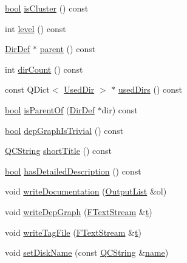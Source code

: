 \begin{DoxyCompactItemize}
\item 
\hyperlink{qglobal_8h_a1062901a7428fdd9c7f180f5e01ea056}{bool} \hyperlink{class_dir_def_a2deda1c14a47090a00a91271860ce7bf}{is\+Cluster} () const 
\item 
int \hyperlink{class_dir_def_aaf4bef6c8d1dcf6219121372c72b7812}{level} () const 
\item 
\hyperlink{class_dir_def}{Dir\+Def} $\ast$ \hyperlink{class_dir_def_a841f399b390e1d0ff927629db1186b9f}{parent} () const 
\item 
int \hyperlink{class_dir_def_ac6081a8ef74c5c231d90c268fd10c474}{dir\+Count} () const 
\item 
const Q\+Dict$<$ \hyperlink{class_used_dir}{Used\+Dir} $>$ $\ast$ \hyperlink{class_dir_def_a7df88c7c7bc1bec99cd726c233fdd997}{used\+Dirs} () const 
\item 
\hyperlink{qglobal_8h_a1062901a7428fdd9c7f180f5e01ea056}{bool} \hyperlink{class_dir_def_a4f9f8fa0a9d2415b6d934fd9ed9bcd5e}{is\+Parent\+Of} (\hyperlink{class_dir_def}{Dir\+Def} $\ast$dir) const 
\item 
\hyperlink{qglobal_8h_a1062901a7428fdd9c7f180f5e01ea056}{bool} \hyperlink{class_dir_def_a5ed920ae0dccb5085d339dabb30bcc73}{dep\+Graph\+Is\+Trivial} () const 
\item 
\hyperlink{class_q_c_string}{Q\+C\+String} \hyperlink{class_dir_def_a59945b424ea2484f75fad6be0a4b7e6d}{short\+Title} () const 
\item 
\hyperlink{qglobal_8h_a1062901a7428fdd9c7f180f5e01ea056}{bool} \hyperlink{class_dir_def_a2241068ee23356c5ce535cbfc04ba2be}{has\+Detailed\+Description} () const 
\item 
void \hyperlink{class_dir_def_a000d1daece49eaabe805fb709be01c67}{write\+Documentation} (\hyperlink{class_output_list}{Output\+List} \&ol)
\item 
void \hyperlink{class_dir_def_a3441dff967600b9ea76533d87cb21afd}{write\+Dep\+Graph} (\hyperlink{class_f_text_stream}{F\+Text\+Stream} \&\hyperlink{058__bracket__recursion_8tcl_a69e959f6901827e4d8271aeaa5fba0fc}{t})
\item 
void \hyperlink{class_dir_def_ad8d1b300a4725b99ccded183e05a87f0}{write\+Tag\+File} (\hyperlink{class_f_text_stream}{F\+Text\+Stream} \&\hyperlink{058__bracket__recursion_8tcl_a69e959f6901827e4d8271aeaa5fba0fc}{t})
\item 
void \hyperlink{class_dir_def_ac7523093d0169e18520b8893aa664f34}{set\+Disk\+Name} (const \hyperlink{class_q_c_string}{Q\+C\+String} \&\hyperlink{class_definition_a99481361779e85f0c1556709de7d9e5b}{name})
\end{DoxyCompactItemize}
